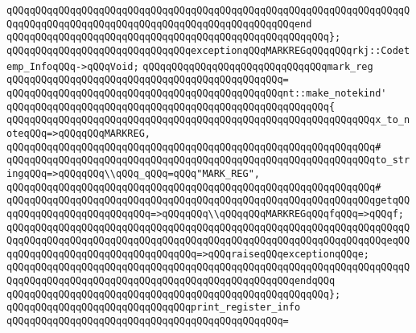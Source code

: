 \verb|qQQqqQQqqQQqqQQqqQQqqQQqqQQqqQQqqQQqqQQqqQQqqQQqqQQqqQQqqQQqqQQqqQQqqQQqqQQqqQQqqQQqqQQqqQQqqQQqqQQqqQQqqQQqqQQqqQQqqQQqend|\newline
\verb|qQQqqQQqqQQqqQQqqQQqqQQqqQQqqQQqqQQqqQQqqQQqqQQqqQQqqQQq};|\newline
\newline
\verb|qQQqqQQqqQQqqQQqqQQqqQQqqQQqqQQqexceptionqQQqMARKREGqQQqqQQqrkj::Codetemp_InfoqQQq->qQQqVoid;|\newline
\newline
\verb|qQQqqQQqqQQqqQQqqQQqqQQqqQQqqQQqmark_reg|\newline
\verb|qQQqqQQqqQQqqQQqqQQqqQQqqQQqqQQqqQQqqQQqqQQqqQQq=|\newline
\verb|qQQqqQQqqQQqqQQqqQQqqQQqqQQqqQQqqQQqqQQqqQQqqQQqnt::make_notekind'|\newline
\verb|qQQqqQQqqQQqqQQqqQQqqQQqqQQqqQQqqQQqqQQqqQQqqQQqqQQqqQQq{|\newline
\verb|qQQqqQQqqQQqqQQqqQQqqQQqqQQqqQQqqQQqqQQqqQQqqQQqqQQqqQQqqQQqqQQqx_to_noteqQQq=>qQQqqQQqMARKREG,|\newline
\verb|qQQqqQQqqQQqqQQqqQQqqQQqqQQqqQQqqQQqqQQqqQQqqQQqqQQqqQQqqQQqqQQq#|\newline
\verb|qQQqqQQqqQQqqQQqqQQqqQQqqQQqqQQqqQQqqQQqqQQqqQQqqQQqqQQqqQQqqQQqto_stringqQQq=>qQQqqQQq\\qQQq_qQQq=qQQq"MARK_REG",|\newline
\verb|qQQqqQQqqQQqqQQqqQQqqQQqqQQqqQQqqQQqqQQqqQQqqQQqqQQqqQQqqQQqqQQq#|\newline
\verb|qQQqqQQqqQQqqQQqqQQqqQQqqQQqqQQqqQQqqQQqqQQqqQQqqQQqqQQqqQQqqQQqgetqQQqqQQqqQQqqQQqqQQqqQQqqQQq=>qQQqqQQq\\qQQqqQQqMARKREGqQQqfqQQq=>qQQqf;|\newline
\verb|qQQqqQQqqQQqqQQqqQQqqQQqqQQqqQQqqQQqqQQqqQQqqQQqqQQqqQQqqQQqqQQqqQQqqQQqqQQqqQQqqQQqqQQqqQQqqQQqqQQqqQQqqQQqqQQqqQQqqQQqqQQqqQQqqQQqqQQqeqQQqqQQqqQQqqQQqqQQqqQQqqQQqqQQqqQQq=>qQQqraiseqQQqexceptionqQQqe;|\newline
\verb|qQQqqQQqqQQqqQQqqQQqqQQqqQQqqQQqqQQqqQQqqQQqqQQqqQQqqQQqqQQqqQQqqQQqqQQqqQQqqQQqqQQqqQQqqQQqqQQqqQQqqQQqqQQqqQQqqQQqqQQqendqQQq|\newline
\verb|qQQqqQQqqQQqqQQqqQQqqQQqqQQqqQQqqQQqqQQqqQQqqQQqqQQqqQQq};|\newline
\newline
\verb|qQQqqQQqqQQqqQQqqQQqqQQqqQQqqQQqprint_register_info|\newline
\verb|qQQqqQQqqQQqqQQqqQQqqQQqqQQqqQQqqQQqqQQqqQQqqQQq=|\newline
